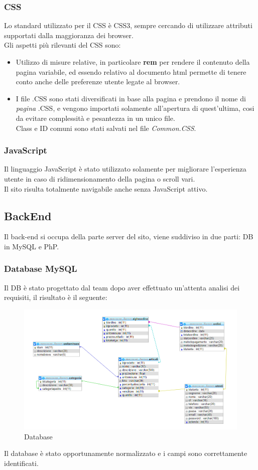\subsubsection{CSS}
Lo standard utilizzato per il CSS è CSS3, sempre cercando di utilizzare attributi supportati dalla maggioranza dei browser.\\
Gli aspetti più rilevanti del CSS sono:
\begin{itemize}
	\item Utilizzo di misure relative, in particolare \textbf{rem} per rendere il contenuto della pagina variabile, ed essendo relativo al documento html permette di tenere conto anche delle preferenze utente legate al browser.
	\item I file .CSS sono stati diversificati in base alla pagina e prendono il nome di \textit{pagina} .CSS, e vengono importati solamente all'apertura di quest'ultima, cosi da evitare complessità e pesantezza in un unico file.\\Class e ID comuni sono stati salvati nel file \textit{Common.CSS}.
\end{itemize}

\subsubsection{JavaScript}
Il linguaggio JavaScript è stato utilizzato solamente per migliorare l'esperienza utente in caso di ridimensionamento della pagina o scroll vari.\\ Il sito risulta totalmente navigabile anche senza JavaScript attivo.
\newpage
\subsection{BackEnd}
Il back-end si occupa della parte server del sito, viene suddiviso in due parti: DB in MySQL e PhP.

\subsubsection{Database MySQL}
Il DB è stato progettato dal team dopo aver effettuato un'attenta analisi dei requisiti, il risultato è il seguente:
\begin{figure}[H]
	\includegraphics[width=\linewidth]{res/img/DB}
	\caption{Database}
	\label{Database Walk And Buy}
\end{figure}
Il database è stato opportunamente normalizzato e i campi sono correttamente identificati.

